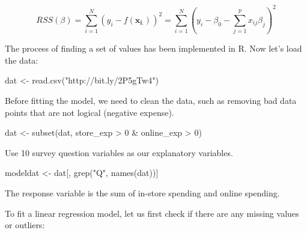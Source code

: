 \documentclass[
  12pt,
]{krantz}
\makeatletter
\newenvironment{Shaded}{\begin{snugshade}}{\end{snugshade}}
\newcommand{\CommentTok}[1]{\textcolor[rgb]{0.37,0.37,0.37}{\textit{#1}}}
\newcommand{\DecValTok}[1]{\textcolor[rgb]{0.06,0.06,0.06}{#1}}
\newcommand{\FunctionTok}[1]{\textcolor[rgb]{0,0,0}{#1}}
\newcommand{\NormalTok}[1]{#1}
\newcommand{\OtherTok}[1]{\textcolor[rgb]{0.37,0.37,0.37}{#1}}
\newcommand{\SpecialCharTok}[1]{\textcolor[rgb]{0,0,0}{#1}}
\newcommand{\StringTok}[1]{\textcolor[rgb]{0.5,0.5,0.5}{#1}}
\newenvironment{kframe}{%
\medskip{}
\setlength{\fboxsep}{.8em}
 \def\at@end@of@kframe{}%
 \ifinner\ifhmode%
  \def\at@end@of@kframe{\end{minipage}}%
  \begin{minipage}{\columnwidth}%
 \fi\fi%
 \def\FrameCommand##1{\hskip\@totalleftmargin \hskip-\fboxsep
 \colorbox{shadecolor}{##1}\hskip-\fboxsep
     \hskip-\linewidth \hskip-\@totalleftmargin \hskip\columnwidth}%
 \MakeFramed {\advance\hsize-\width
   \@totalleftmargin\z@ \linewidth\hsize
   \@setminipage}}%
 {\par\unskip\endMakeFramed%
 \at@end@of@kframe}
\renewenvironment{Shaded}{\begin{kframe}}{\end{kframe}}
\makeatother
\begin{document}
\[RSS(\beta)=\sum_{i=1}^{N}(y_{i}-f(\mathbf{x_{i.}}))^{2}=\sum_{i=1}^{N}(y_{i}-\beta_{0}-\sum_{j=1}^{p}x_{ij}\beta_{j})^{2}\]

The process of finding a set of values has been implemented in R. Now let's load the data:

\begin{Shaded}
\begin{Highlighting}[]
\NormalTok{dat }\OtherTok{\textless{}{-}} \FunctionTok{read.csv}\NormalTok{(}\StringTok{"http://bit.ly/2P5gTw4"}\NormalTok{)}
\end{Highlighting}
\end{Shaded}

Before fitting the model, we need to clean the data, such as removing bad data points that are not logical (negative expense).

\begin{Shaded}
\begin{Highlighting}[]
\NormalTok{dat }\OtherTok{\textless{}{-}} \FunctionTok{subset}\NormalTok{(dat, store\_exp }\SpecialCharTok{\textgreater{}} \DecValTok{0} \SpecialCharTok{\&}\NormalTok{ online\_exp }\SpecialCharTok{\textgreater{}} \DecValTok{0}\NormalTok{)}
\end{Highlighting}
\end{Shaded}

Use 10 survey question variables as our explanatory variables.

\begin{Shaded}
\begin{Highlighting}[]
\NormalTok{modeldat }\OtherTok{\textless{}{-}}\NormalTok{ dat[, }\FunctionTok{grep}\NormalTok{(}\StringTok{"Q"}\NormalTok{, }\FunctionTok{names}\NormalTok{(dat))]}
\end{Highlighting}
\end{Shaded}

The response variable is the sum of in-store spending and online spending.

\begin{Shaded}
\end{Shaded}

To fit a linear regression model, let us first check if there are any missing values or outliers:
\end{document}
